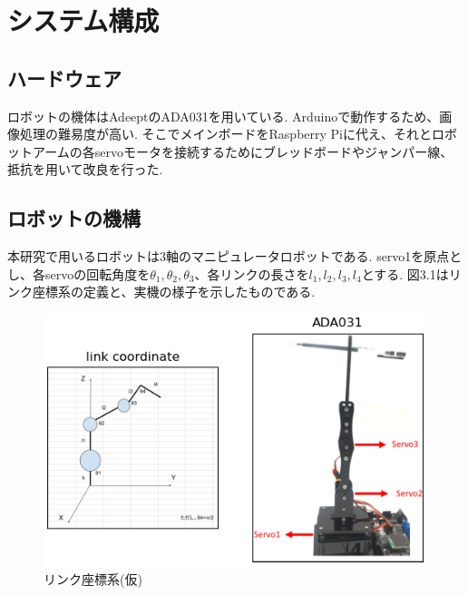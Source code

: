 \chapter{システム構成}
  \label{chap:system}
  \section{ハードウェア}
  	\label{chap:hardware}
 	ロボットの機体はAdeeptのADA031を用いている. Arduinoで動作するため、画像処理の難易度が高い. そこでメインボードをRaspberry Piに代え、それとロボットアームの各servoモータを接続するためにブレッドボードやジャンパー線、抵抗を用いて改良を行った.
  \section{ロボットの機構}
  	\label{chap:mechanism}
	本研究で用いるロボットは3軸のマニピュレータロボットである. servo1を原点とし、各servoの回転角度を$\theta_1, \theta_2, \theta_3$、各リンクの長さを$l_1, l_2, l_3, l_4$とする. 図3.1はリンク座標系の定義と、実機の様子を示したものである.
		 \begin{center}
        \begin{figure}[h]
            \includegraphics[width=1.0\textwidth]{./img/002.png}
            \caption{リンク座標系(仮)}
            \label{test}
        \end{figure}
    \end{center}

